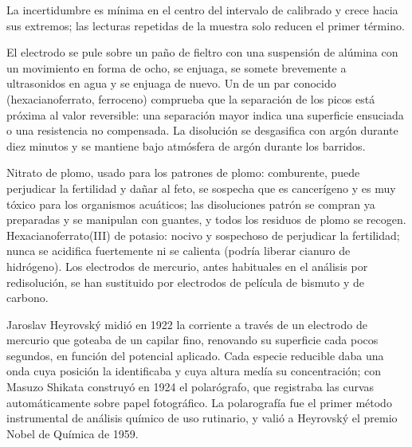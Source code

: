 La incertidumbre es mínima en el centro del intervalo de calibrado y crece
hacia sus extremos; las lecturas repetidas de la muestra solo reducen el primer término.

\begin{inthelab}
El electrodo se pule sobre un paño de fieltro con una suspensión de alúmina con un
movimiento en forma de ocho, se enjuaga, se somete brevemente a ultrasonidos en agua y se enjuaga de nuevo. Un
 de un par conocido (hexacianoferrato, ferroceno) comprueba que la
separación de los picos está próxima al valor reversible: una separación mayor indica una
superficie ensuciada o una resistencia no compensada. La disolución se desgasifica con
argón durante diez minutos y se mantiene bajo atmósfera de argón durante los barridos.
\end{inthelab}

\begin{safety}{}
Nitrato de plomo, usado para los patrones de plomo: comburente, puede perjudicar la fertilidad y
dañar al feto, se sospecha que es cancerígeno y es muy tóxico para los organismos acuáticos; las disoluciones
patrón se compran ya preparadas y se manipulan con guantes, y todos los residuos de plomo se
recogen. Hexacianoferrato(III) de potasio: nocivo y sospechoso de perjudicar la
fertilidad; nunca se acidifica fuertemente ni se calienta (podría liberar cianuro de
hidrógeno). Los electrodos de mercurio, antes habituales en el análisis por redisolución, se han
sustituido por electrodos de película de bismuto y de carbono.
\end{safety}

\begin{history}
Jaroslav Heyrovský midió en 1922 la corriente a través de un electrodo de mercurio
que goteaba de un capilar fino, renovando su superficie cada pocos segundos,
en función del potencial aplicado. Cada especie reducible daba una onda cuya
posición la identificaba y cuya altura medía su concentración; con
Masuzo Shikata construyó en 1924 el polarógrafo, que registraba las curvas
automáticamente sobre papel fotográfico. La polarografía fue el primer método
instrumental de análisis químico de uso rutinario, y valió a Heyrovský el premio Nobel
de Química de 1959.
\end{history}

